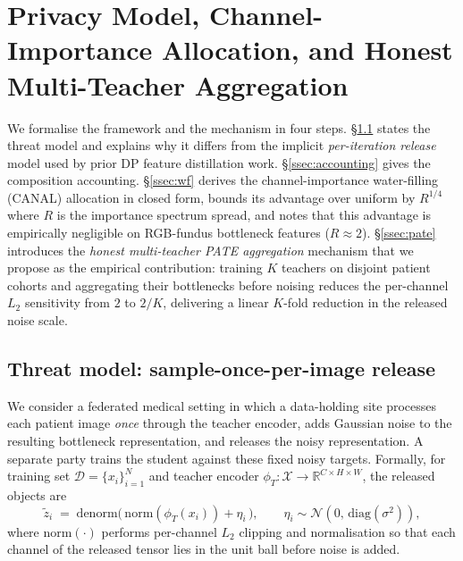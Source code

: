%
%

\section{Privacy Model, Channel-Importance Allocation, and Honest Multi-Teacher Aggregation}
\label{sec:privacy}

We formalise the framework and the mechanism in four steps.
\S\ref{ssec:threat} states the threat model and explains why it differs
from the implicit \emph{per-iteration release} model used by prior DP
feature distillation work. \S\ref{ssec:accounting} gives the composition
accounting. \S\ref{ssec:wf} derives the channel-importance water-filling
(CANAL) allocation in closed form, bounds its advantage over uniform by
$R^{1/4}$ where $R$ is the importance spectrum spread, and notes that
this advantage is empirically negligible on RGB-fundus bottleneck
features ($R \!\approx\! 2$). \S\ref{ssec:pate} introduces the
\emph{honest multi-teacher PATE aggregation} mechanism that we propose
as the empirical contribution: training $K$ teachers on disjoint patient
cohorts and aggregating their bottlenecks before noising reduces the
per-channel $L_2$ sensitivity from $2$ to $2/K$, delivering a linear
$K$-fold reduction in the released noise scale.

\subsection{Threat model: sample-once-per-image release}
\label{ssec:threat}

We consider a federated medical setting in which a data-holding site
processes each patient image \emph{once} through the teacher encoder,
adds Gaussian noise to the resulting bottleneck representation, and
releases the noisy representation. A separate party trains the student
against these fixed noisy targets. Formally, for training set
$\mathcal{D}=\{x_i\}_{i=1}^{N}$ and teacher encoder
$\phi_T : \mathcal{X}\!\to\!\mathbb{R}^{C\times H\times W}$, the
released objects are
\begin{equation}
\widetilde{z}_i \;=\; \mathrm{denorm}\!\bigl(\,\mathrm{norm}(\phi_T(x_i)) + \eta_i\,\bigr),
\qquad \eta_i \sim \mathcal{N}(0,\,\mathrm{diag}(\sigma^2)),
\label{eq:release}
\end{equation}
where $\mathrm{norm}(\cdot)$ performs per-channel $L_2$ clipping and
normalisation so that each channel of the released tensor lies in the
unit ball before noise is added.

